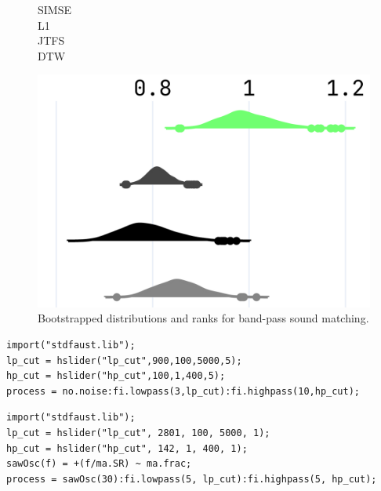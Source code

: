 \documentclass{article} %
\newcommand{\BPNoise}{\textbf{BP-Noise}\xspace}
\newcommand{\BPSaw}{\textbf{BP-Saw}\xspace}
\begin{document}
\begin{figure}[htbp]
  \centering
  \scriptsize
  \begin{minipage}{\columnwidth}
    \begin{minipage}{0.10\columnwidth}
      \raggedleft
      \vspace{0.5cm}
      SIMSE\\[0.6cm]
      L1\\[0.65cm]
      JTFS\\[0.65cm]
      DTW
    \end{minipage}%
    \begin{minipage}{0.88\columnwidth}
      \centering
      \includegraphics[width=\linewidth]{images/npsk_ood_P_Loss_3.png}
    \end{minipage}
  \end{minipage}
  \caption{Bootstrapped distributions and ranks for band-pass sound matching.}
  \label{fig:npsk_BP}
\end{figure}



\begin{lstlisting}[caption={\BPNoise}, label={lst:program0}, language=Faust,
                  float, floatplacement=!H, xleftmargin=1em, xrightmargin=0.5em, firstnumber=0, aboveskip=0em, belowskip=-1em]
import("stdfaust.lib");
lp_cut = hslider("lp_cut",900,100,5000,5);
hp_cut = hslider("hp_cut",100,1,400,5);
process = no.noise:fi.lowpass(3,lp_cut):fi.highpass(10,hp_cut);
\end{lstlisting}

\begin{lstlisting}[caption={\BPSaw}, label={lst:program0_saw}, language=Faust,
                  float, floatplacement=!H, xleftmargin=1em, xrightmargin=0.5em, firstnumber=0, aboveskip=0em, belowskip=-1em]
import("stdfaust.lib");
lp_cut = hslider("lp_cut", 2801, 100, 5000, 1);
hp_cut = hslider("hp_cut", 142, 1, 400, 1);
sawOsc(f) = +(f/ma.SR) ~ ma.frac;
process = sawOsc(30):fi.lowpass(5, lp_cut):fi.highpass(5, hp_cut);
\end{lstlisting}
\end{document}
